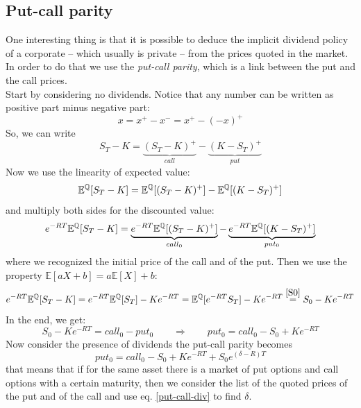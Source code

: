 \subsection{Put-call parity}\label{putcallparity}
One interesting thing is that it is possible to deduce the implicit dividend policy of a corporate -- which usually is private -- from the prices quoted in the market. In order to do that we use the \emph{put-call parity}, which is a link between the put and the call prices. \\
Start by considering no dividends. Notice that any number can be written as positive part minus negative part:
\begin{equation*}
    x = x^+ - x^- = x^+ - (-x)^+
\end{equation*}
So, we can write
\begin{equation}
    S_T - K = \underbrace{(S_T - K)^+}_{call} - \underbrace{(K - S_T)^+}_{put}
\end{equation}
Now we use the linearity of expected value:
\begin{equation*}
    \mathbb{E}^{\mathbb{Q}}[S_T-K] = \mathbb{E}^{\mathbb{Q}}[(S_T-K)^+] - \mathbb{E}^{\mathbb{Q}}[(K-S_T)^+]
\end{equation*}
and multiply both sides for the discounted value:
\begin{equation*}
    e^{-RT}\mathbb{E}^{\mathbb{Q}}[S_T-K] = \underbrace{e^{-RT}\mathbb{E}^{\mathbb{Q}}[(S_T-K)^+]}_{call_0} -
    \underbrace{e^{-RT}\mathbb{E}^{\mathbb{Q}}[(K-S_T)^+]}_{put_0}
\end{equation*}
where we recognized the initial price of the call and of the put. Then we use the property ${\mathbb{E}}[aX+b]=a{\mathbb{E}}[X]+b$:
\begin{equation*}
    e^{-RT}\mathbb{E}^{\mathbb{Q}}[S_T-K] = e^{-RT}\mathbb{E}^{\mathbb{Q}}[S_T] - Ke^{-RT} = \mathbb{E}^{\mathbb{Q}}[e^{-RT}S_T] - Ke^{-RT} \overset{\eqref{S0}}{=} S_0 - Ke^{-RT}
\end{equation*}
In the end, we get:
\begin{equation}\label{put-call}
    S_0 - Ke^{-RT} = call_0 - put_0 \qquad\Rightarrow\qquad put_0 = call_0 - S_0 +  Ke^{-RT}
\end{equation}
Now consider the presence of dividends the put-call parity becomes
\begin{equation}\label{put-call-div}
    put_0 = call_0 - S_0 +  Ke^{-RT} + S_0e^{(\delta - R)T}
\end{equation}
that means that if for the same asset there is a market of put options and call options with a certain maturity, then we consider the list of the quoted prices of the put and of the call and use eq. \eqref{put-call-div} to find $\delta$.

